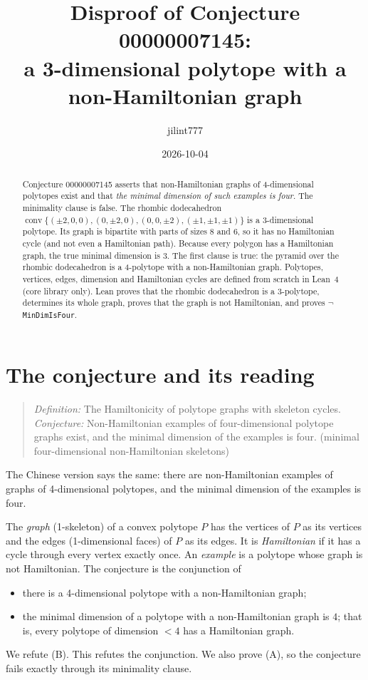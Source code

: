 \documentclass[11pt]{article}
\title{Disproof of Conjecture 00000007145:\\
a 3-dimensional polytope with a non-Hamiltonian graph}
\author{jilint777}
\date{2026-10-04}
\theoremstyle{definition}
\theoremstyle{remark}
\begin{document}
\sloppy
\maketitle

\begin{abstract}
Conjecture 00000007145 asserts that non-Hamiltonian graphs of 4-dimensional
polytopes exist and that \emph{the minimal dimension of such examples is four}.
The minimality clause is false. The rhombic dodecahedron
$\operatorname{conv}\{(\pm2,0,0),(0,\pm2,0),(0,0,\pm2),(\pm1,\pm1,\pm1)\}$ is a
3-dimensional polytope. Its graph is bipartite with parts of sizes $8$ and $6$,
so it has no Hamiltonian cycle (and not even a Hamiltonian path). Because every
polygon has a Hamiltonian graph, the true minimal dimension is $3$. The first
clause is true: the pyramid over the rhombic dodecahedron is a 4-polytope with a
non-Hamiltonian graph. Polytopes, vertices, edges, dimension and Hamiltonian
cycles are defined from scratch in Lean~4 (core library only). Lean proves that the
rhombic dodecahedron is a 3-polytope, determines its whole graph, proves
that the graph is not Hamiltonian, and proves $\neg$\,\texttt{MinDimIsFour}.
\end{abstract}

\section{The conjecture and its reading}
\begin{quote}
\emph{Definition:} The Hamiltonicity of polytope graphs with skeleton cycles.
\emph{Conjecture:} Non-Hamiltonian examples of four-dimensional polytope graphs
exist, and the minimal dimension of the examples is four. (minimal
four-dimensional non-Hamiltonian skeletons)
\end{quote}
The Chinese version says the same: there are non-Hamiltonian examples of graphs of
4-dimensional polytopes, and the minimal dimension of the examples is four.

The \emph{graph} (1-skeleton) of a convex polytope $P$ has the vertices of $P$ as
its vertices and the edges (1-dimensional faces) of $P$ as its edges. It is
\emph{Hamiltonian} if it has a cycle through every vertex exactly once. An
\emph{example} is a polytope whose graph is not Hamiltonian. The conjecture is the
conjunction of
\begin{itemize}
\item[(A)] there is a 4-dimensional polytope with a non-Hamiltonian graph;
\item[(B)] the minimal dimension of a polytope with a non-Hamiltonian graph is $4$;
that is, every polytope of dimension $<4$ has a Hamiltonian graph.
\end{itemize}
We refute (B). This refutes the conjunction. We also prove (A), so the conjecture
fails exactly through its minimality clause.
\end{document}

